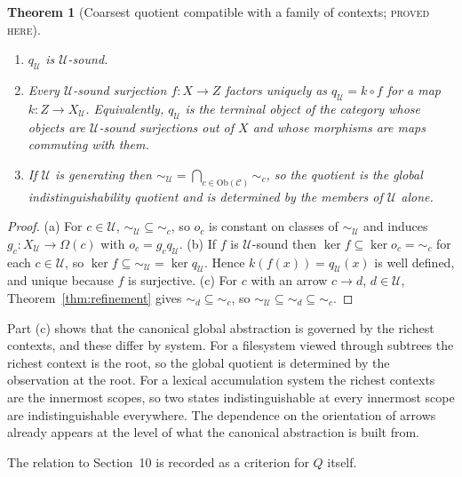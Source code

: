 \documentclass[11pt]{article}
\newtheorem{theorem}{Theorem}[section]
\theoremstyle{definition}
\theoremstyle{remark}
\newcommand{\stN}{\textsc{proved here}}
\newcommand{\cC}{\mathcal C}
\newcommand{\cU}{\mathcal U}
\newcommand{\Ob}{\mathrm{Ob}}
\newcommand{\sk}{\sim}
\begin{document}
\begin{theorem}[Coarsest quotient compatible with a family of contexts; \stN]\label{thm:coarsest}
\begin{enumerate}[label=(\alph*)]
\item $q_\cU$ is $\cU$-sound.
\item Every $\cU$-sound surjection $f:X\to Z$ factors uniquely as $q_\cU=k\circ f$ for a map $k:Z\to X_\cU$. Equivalently, $q_\cU$ is the terminal object of the category whose objects are $\cU$-sound surjections out of $X$ and whose morphisms are maps commuting with them.
\item If $\cU$ is generating then ${\sk_\cU}=\bigcap_{c\in\Ob(\cC)}{\sk_c}$, so the quotient is the global indistinguishability quotient and is determined by the members of $\cU$ alone.
\end{enumerate}
\end{theorem}
\begin{proof}
(a) For $c\in\cU$, ${\sk_\cU}\subseteq{\sk_c}$, so $o_c$ is constant on classes of $\sk_\cU$ and induces $g_c:X_\cU\to\Omega(c)$ with $o_c=g_cq_\cU$. (b) If $f$ is $\cU$-sound then $\ker f\subseteq\ker o_c={\sk_c}$ for each $c\in\cU$, so $\ker f\subseteq{\sk_\cU}=\ker q_\cU$. Hence $k(f(x))=q_\cU(x)$ is well defined, and unique because $f$ is surjective. (c) For $c$ with an arrow $c\to d$, $d\in\cU$, Theorem~\ref{thm:refinement} gives ${\sk_d}\subseteq{\sk_c}$, so ${\sk_\cU}\subseteq{\sk_d}\subseteq{\sk_c}$.
\end{proof}

Part (c) shows that the canonical global abstraction is governed by the richest contexts, and these differ by system. For a filesystem viewed through subtrees the richest context is the root, so the global quotient is determined by the observation at the root. For a lexical accumulation system the richest contexts are the innermost scopes, so two states indistinguishable at every innermost scope are indistinguishable everywhere. The dependence on the orientation of arrows already appears at the level of what the canonical abstraction is built from.

The relation to Section~10 is recorded as a criterion for $Q$ itself.
\end{document}
